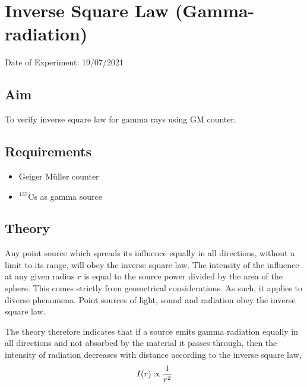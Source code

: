 
	
	
	\chapter{Inverse Square Law (Gamma-radiation)}
	\vspace{-1cm}
	\begin{center}%
		Date of Experiment: 19/07/2021
	\end{center}
	\section{Aim}
	To verify inverse square law for gamma rays using GM counter.
	
	\section{Requirements}
	\begin{itemize}
		\item 	Geiger M{\"u}ller counter
		\item 	$ ^{137} $Cs as gamma source
	\end{itemize}
	
	\section{Theory}
	Any point source which spreads its influence equally in all directions, without a limit to its range, will obey the inverse square law. The intensity of the influence at any given radius $ r $ is equal to the source power divided by the area of the sphere. This comes strictly from geometrical considerations. As such, it applies to diverse phenomena. Point sources of light, sound and radiation obey the inverse square law.
	
	The theory therefore indicates that if a source emits gamma radiation equally in all directions and not absorbed by the material it passes through, then the intensity of radiation decreases with distance according to the inverse square law,
	\begin{equation}{\label{eqn:inv-sq-law}}
		I(r) \propto \dfrac{1}{r^2}
	\end{equation}
	
